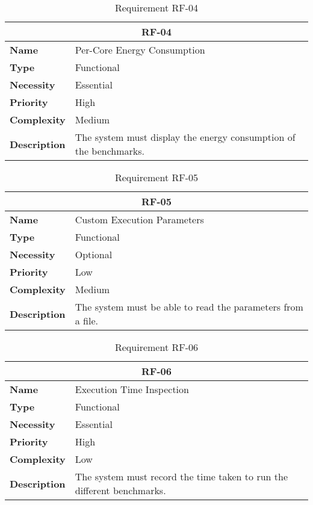\begin{table}[H]
    \centering
    \begin{tabular}{l p{10cm}}
        \toprule
        \multicolumn{2}{c}{\textbf{RF-04}} \\
        \toprule
        \textbf{Name}               & Per-Core Energy Consumption \\
        \textbf{Type}               & Functional \\
        \textbf{Necessity}          & Essential \\
        \textbf{Priority}           & High \\
        \textbf{Complexity}         & Medium \\
        \textbf{Description}        & The system must display the energy consumption of the benchmarks. \\
        \bottomrule
    \end{tabular}
\caption{Requirement RF-04}\label{tab:rf-04}
\end{table}

\begin{table}[H]
    \centering
    \begin{tabular}{l p{10cm}}
        \toprule
        \multicolumn{2}{c}{\textbf{RF-05}} \\
        \toprule
        \textbf{Name}               & Custom Execution Parameters \\
        \textbf{Type}               & Functional \\
        \textbf{Necessity}          & Optional \\
        \textbf{Priority}           & Low \\
        \textbf{Complexity}         & Medium \\
        \textbf{Description}        & The system must be able to read the parameters from a file. \\
        \bottomrule
    \end{tabular}
\caption{Requirement RF-05}\label{tab:rf-05}
\end{table}

\begin{table}[H]
    \centering
    \begin{tabular}{l p{10cm}}
        \toprule
        \multicolumn{2}{c}{\textbf{RF-06}} \\
        \toprule
        \textbf{Name}               & Execution Time Inspection \\
        \textbf{Type}               & Functional \\
        \textbf{Necessity}          & Essential \\
        \textbf{Priority}           & High \\
        \textbf{Complexity}         & Low \\
        \textbf{Description}        & The system must record the time taken to run the different benchmarks. \\
        \bottomrule
    \end{tabular}
\caption{Requirement RF-06}\label{tab:rf-06}
\end{table}

